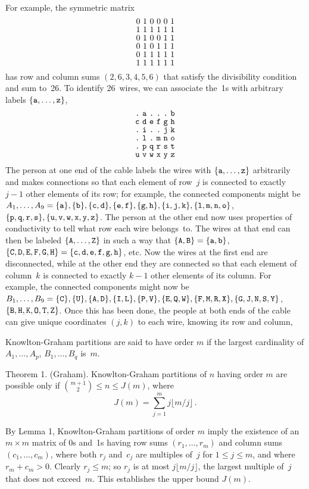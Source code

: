 {For example, the symmetric matrix
$$
\advance\baselineskip-2pt
\vcenter{\halign{\hfil#\hfil\ &\hfil#\hfil\ &\hfil#\hfil\ %
&\hfil#\hfil\ &\hfil#\hfil\ &\hfil#\hfil\cr
0&1&0&0&0&1\cr
1&1&1&1&1&1\cr
0&1&0&0&1&1\cr
0&1&0&1&1&1\cr
0&1&1&1&1&1\cr
1&1&1&1&1&1\cr}}$$
has row and column sums $(2,6,3,4,5,6)$ that satisfy the divisibility condition
and sum to~26. To identify 26~wires, we can associate the~1s with arbitrary
labels $\{\tt a,\ldots,\tt z\}$,
$$
\advance\baselineskip-2pt
\vcenter{\halign{\hfil{\tt#}\hfil\ &\hfil{\tt#}\hfil\ %
&\hfil{\tt#}\hfil\ &\hfil{\tt#}\hfil\ &\hfil{\tt#}\hfil\ %
&\hfil{\tt#}\hfil\cr
.&a&.&.&.&b\cr
c&d&e&f&g&h\cr
.&i&.&.&j&k\cr
.&l&.&m&n&o\cr
.&p&q&r&s&t\cr
u&v&w&x&y&z\cr}}$$
The person at one end of the cable labels the wires with
$\{\tt a,\ldots,\tt z\}$ arbitrarily and makes connections so that each element
of row~$j$ is connected to exactly $j-1$ other elements of its row; for
example, the connected components might be $A_1,\ldots,A_9=\{\tt a\},\{\tt b\},
\{\tt c,\tt d\},\{\tt e,\tt f\},\{\tt g,\tt h\},\{\tt i,\tt j,\tt k\},
\{\tt l,\tt m,\tt n,\tt o\}$,
$\{\tt p,\tt q,\tt r,\tt s\},\{\tt u,\tt v,\tt w,\tt x,\tt y,
\tt z\}$. The person at the other end now uses properties of conductivity
to tell what row each wire belongs~to. 
The wires at that end can then be labeled
$\{\tt A,\ldots,\tt Z\}$ in such a way that
$\{\tt A,\tt B\}=\{\tt a,\tt b\}$, $\{\tt C,\tt D,\tt E,\tt F,\tt G,\tt H\}
=\{\tt c,\tt d,\tt e,\tt f,\tt g,\tt h\}$, etc. Now the wires at the first end 
 are disconnected, while at the other end they are connected so that each
element of column~$k$ is connected to exactly $k-1$ other elements of its
column. For example, the connected components might now be $B_1,\ldots,B_9
=\{\tt C\},\{\tt U\},\{\tt A,\tt D\},\{\tt I,\tt L\},\{\tt P,\tt V\},
\{\tt E,\tt Q,\tt W\},\{\tt F,\tt M,\tt R,\tt X\},
\{\tt G,\tt J,\tt N,\tt S,\tt Y\}$,\break
$\{\tt B,\tt H,\tt K,\tt O,\tt T,\tt Z\}$. 
Once this has been done, the people at both ends of the cable
can give unique coordinates $(j,k)$ to each wire, knowing its row and column,

Knowlton-Graham partitions are said to have order $m$ if the largest
cardinality of $A_1,\ldots, A_p$, $B_1,\ldots,B_q$ is~$m$. 

\proclaim
Theorem 1. {\rm (Graham).}
Knowlton-Graham partitions of\/ $n$ having order\/ $m$ are possible only if\/
${m+1\choose 2}\leq n\leq J(m)$, where
$$J(m)=\sum_{j=1}^mj\lfloor m/j\rfloor\,.$$

\proof
By Lemma 1, Knowlton-Graham partitions of order $m$ imply the existence of an
$m\times m$ matrix of 0s and~1s having row sums $(r_1,\ldots,r_m)$ and column
sums $(c_1,\ldots,c_m)$, where both $r_j$ and~$c_j$ are multiples of~$j$ for
$1\leq j\leq m$, and where $r_m+c_m>0$. Clearly $r_j\leq m$; so $r_j$ is at
most $j\lfloor m/j\rfloor$, the largest multiple of~$j$ that does not
exceed~$m$. This establishes the upper bound $J(m)$.

}
